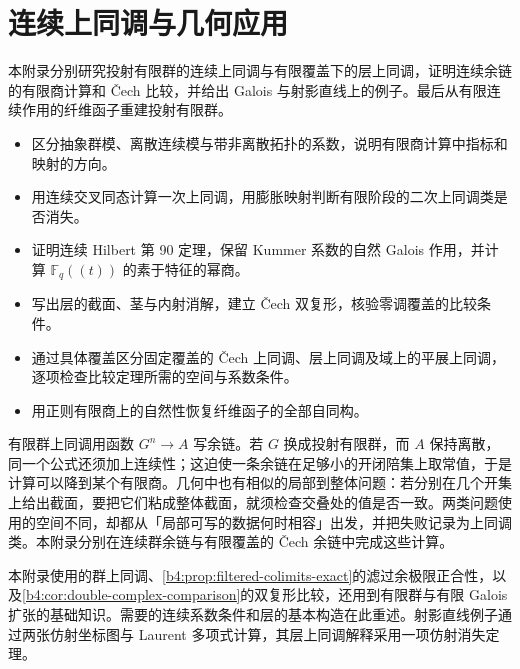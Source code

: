 

\chapter{连续上同调与几何应用}
\label{b4:app:C}

\begin{chapterabstract}
	本附录分别研究投射有限群的连续上同调与有限覆盖下的层上同调，证明连续余链的有限商计算和 Čech 比较，并给出 Galois 与射影直线上的例子。最后从有限连续作用的纤维函子重建投射有限群。
\end{chapterabstract}

\begin{learninggoals}
	\begin{itemize}
		\item 区分抽象群模、离散连续模与带非离散拓扑的系数，说明有限商计算中指标和映射的方向。
		\item 用连续交叉同态计算一次上同调，用膨胀映射判断有限阶段的二次上同调类是否消失。
		\item 证明连续 Hilbert 第 90 定理，保留 Kummer 系数的自然 Galois 作用，并计算 \(\mathbb F_q(\!(t)\!)\) 的素于特征的幂商。
		\item 写出层的截面、茎与内射消解，建立 Čech 双复形，核验零调覆盖的比较条件。
		\item 通过具体覆盖区分固定覆盖的 Čech 上同调、层上同调及域上的平展上同调，逐项检查比较定理所需的空间与系数条件。
		\item 用正则有限商上的自然性恢复纤维函子的全部自同构。
	\end{itemize}
\end{learninggoals}

有限群上同调用函数 \(G^n\rightarrow A\) 写余链。若 \(G\) 换成投射有限群，而 \(A\) 保持离散，同一个公式还须加上连续性；这迫使一条余链在足够小的开闭陪集上取常值，于是计算可以降到某个有限商。几何中也有相似的局部到整体问题：若分别在几个开集上给出截面，要把它们粘成整体截面，就须检查交叠处的值是否一致。两类问题使用的空间不同，却都从「局部可写的数据何时相容」出发，并把失败记录为上同调类。本附录分别在连续群余链与有限覆盖的 \v{C}ech 余链中完成这些计算。

\ProseParagraphBreak
本附录使用的群上同调、\cref{b4:prop:filtered-colimits-exact}的滤过余极限正合性，以及\cref{b4:cor:double-complex-comparison}的双复形比较，还用到有限群与有限 Galois 扩张的基础知识。需要的连续系数条件和层的基本构造在此重述。射影直线例子通过两张仿射坐标图与 Laurent 多项式计算，其层上同调解释采用一项仿射消失定理。

